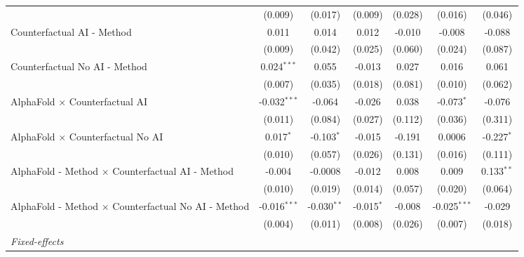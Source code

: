 \begin{tabular}{lcccccc}
                                                              & (0.009)        & (0.017)       & (0.009)       & (0.028)      & (0.016)        & (0.046)\\   
   Counterfactual AI - Method                                 & 0.011          & 0.014         & 0.012         & -0.010       & -0.008         & -0.088\\   
                                                              & (0.009)        & (0.042)       & (0.025)       & (0.060)      & (0.024)        & (0.087)\\   
   Counterfactual No AI - Method                              & 0.024$^{***}$  & 0.055         & -0.013        & 0.027        & 0.016          & 0.061\\   
                                                              & (0.007)        & (0.035)       & (0.018)       & (0.081)      & (0.010)        & (0.062)\\   
   AlphaFold $\times$ Counterfactual AI                       & -0.032$^{***}$ & -0.064        & -0.026        & 0.038        & -0.073$^{*}$   & -0.076\\   
                                                              & (0.011)        & (0.084)       & (0.027)       & (0.112)      & (0.036)        & (0.311)\\   
   AlphaFold $\times$ Counterfactual No AI                    & 0.017$^{*}$    & -0.103$^{*}$  & -0.015        & -0.191       & 0.0006         & -0.227$^{*}$\\   
                                                              & (0.010)        & (0.057)       & (0.026)       & (0.131)      & (0.016)        & (0.111)\\   
   AlphaFold - Method $\times$ Counterfactual AI - Method     & -0.004         & -0.0008       & -0.012        & 0.008        & 0.009          & 0.133$^{**}$\\   
                                                              & (0.010)        & (0.019)       & (0.014)       & (0.057)      & (0.020)        & (0.064)\\   
   AlphaFold - Method $\times$ Counterfactual No AI - Method  & -0.016$^{***}$ & -0.030$^{**}$ & -0.015$^{*}$  & -0.008       & -0.025$^{***}$ & -0.029\\   
                                                              & (0.004)        & (0.011)       & (0.008)       & (0.026)      & (0.007)        & (0.018)\\   
   \midrule
   \emph{Fixed-effects}\\

\end{tabular}
